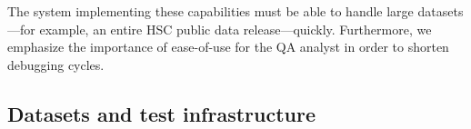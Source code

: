 The system implementing these capabilities must be able to handle large
datasets---for example, an entire HSC public data release---quickly.
Furthermore, we emphasize the importance of ease-of-use for the QA analyst in
order to shorten debugging cycles.

\subsection{Datasets and test infrastructure}
\label{sec:design:test}

